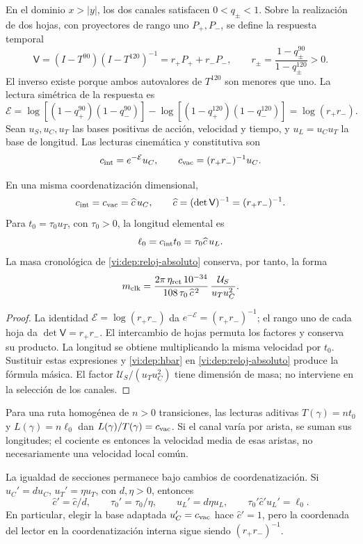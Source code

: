En el dominio \(x>|y|\), los dos canales satisfacen \(0<q_\pm<1\).
Sobre la realización de dos hojas, con proyectores de rango uno
\(P_+,P_-\), se define la respuesta temporal
\[
 \mathsf V=(I-T^{90})(I-T^{120})^{-1}
          =r_+P_++r_-P_-,
 \qquad r_\pm=\frac{1-q_\pm^{90}}{1-q_\pm^{120}}>0.
\]
El inverso existe porque ambos autovalores de \(T^{120}\) son menores
que uno. La lectura simétrica de la respuesta es
\[
 \mathcal E=
 \log[(1-q_+^{90})(1-q_-^{90})]
 -\log[(1-q_+^{120})(1-q_-^{120})]
 =\log(r_+r_-).
\]
Sean \(u_S,u_C,u_T\) las bases positivas de acción, velocidad y
tiempo, y \(u_L=u_Cu_T\) la base de longitud. Las lecturas
cinemática y constitutiva son
\[
 c_{\rm int}=e^{-\mathcal E}u_C,\qquad
 c_{\rm vac}=(r_+r_-)^{-1}u_C.
\]

\begin{proposition}
\label{vi:dep:velocidad-comun}
En una misma coordenatización dimensional,
\[
 c_{\rm int}=c_{\rm vac}=\widehat c\,u_C,
 \qquad \widehat c=(\det\mathsf V)^{-1}=(r_+r_-)^{-1}.
\]
Para \(t_0=\tau_0u_T\), con \(\tau_0>0\), la longitud elemental es
\[
 \ell_0=c_{\rm int}t_0=\tau_0\widehat c\,u_L.
\]
La masa cronológica de \eqref{vi:dep:reloj-absoluto} conserva, por
tanto, la forma
\[
 m_{\rm clk}=
 \frac{2\pi\,\eta_{\rm ret}\,10^{-34}}
      {108\,\tau_0\,\widehat c^{\,2}}\,
 \frac{\mathcal U_S}{u_Tu_C^2}.
\]
\end{proposition}
\begin{proof}
La identidad \(\mathcal E=\log(r_+r_-)\) da
\(e^{-\mathcal E}=(r_+r_-)^{-1}\); el rango uno de cada hoja da
\(\det\mathsf V=r_+r_-\). El intercambio de hojas permuta los
factores y conserva su producto. La longitud se obtiene multiplicando
la misma velocidad por \(t_0\). Sustituir estas expresiones y
\eqref{vi:dep:hbar} en \eqref{vi:dep:reloj-absoluto} produce la
fórmula másica. El factor \(\mathcal U_S/(u_Tu_C^2)\) tiene
dimensión de masa; no interviene en la selección de los canales.
\end{proof}

Para una ruta homogénea de \(n>0\) transiciones, las lecturas aditivas
\(T(\gamma)=nt_0\) y \(L(\gamma)=n\ell_0\) dan
\(L(\gamma)/T(\gamma)=c_{\rm vac}\). Si el canal varía por
arista, se suman sus longitudes; el cociente es entonces la velocidad
media de esas aristas, no necesariamente una velocidad local común.

La igualdad de secciones permanece bajo cambios de coordenatización. Si
\(u_C'=du_C\), \(u_T'=\eta u_T\), con \(d,\eta>0\), entonces
\[
 \widehat c'=\widehat c/d,\qquad
 \tau_0'=\tau_0/\eta,\qquad u_L'=d\eta u_L,
 \qquad
 \tau_0'\widehat c'u_L'=\ell_0.
\]
En particular, elegir la base adaptada \(u_C'=c_{\rm vac}\)
hace \(\widehat c'=1\), pero la coordenada del lector en la
coordenatización interna sigue siendo \((r_+r_-)^{-1}\).


